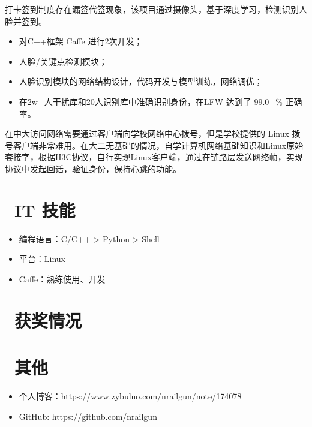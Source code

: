 \documentclass{resume}
\begin{document}
\begin{onehalfspacing}
打卡签到制度存在漏签代签现象，该项目通过摄像头，基于深度学习，检测识别人脸并签到。
\begin{itemize}
  \item 对C++框架 Caffe 进行2次开发；
  \item 人脸/关键点检测模块；
  \item 人脸识别模块的网络结构设计，代码开发与模型训练，网络调优；
  \item 在2w+人干扰库和20人识别库中准确识别身份，在LFW 达到了 99.0+\% 正确率。
\end{itemize}
\end{onehalfspacing}

\begin{onehalfspacing}
在中大访问网络需要通过客户端向学校网络中心拨号，但是学校提供的 Linux 拨号客户端非常难用。在大二无基础的情况，自学计算机网络基础知识和Linux原始套接字，根据H3C协议，自行实现Linux客户端，通过在链路层发送网络帧，实现协议中发起回话，验证身份，保持心跳的功能。
\end{onehalfspacing}


\section{\faCogs\ IT 技能}
\begin{itemize}[parsep=0.5ex]
  \item 编程语言：C/C++ > Python > Shell
  \item 平台：Linux
  \item Caffe：熟练使用、开发
\end{itemize}

\section{\faHeartO\ 获奖情况}

\section{\faInfo\ 其他}
\begin{itemize}[parsep=0.5ex]
  \item 个人博客：https://www.zybuluo.com/nrailgun/note/174078
  \item GitHub: https://github.com/nrailgun
\end{itemize}

%
%
\end{document}
